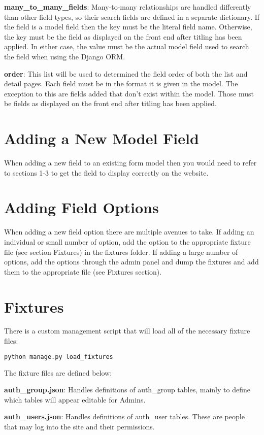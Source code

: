 \documentclass{article}
\begin{document}
\textbf{many\_to\_many\_fields}: Many-to-many relationships are handled differently than other field types, so their search fields are defined in a separate dictionary. If the field is a model field then the key must be the literal field name. Otherwise, the key must be the field as displayed on the front end after titling has been applied. In either case, the value must be the actual model field used to search the field when using the Django ORM.

\textbf{order}: This list will be used to determined the field order of both the list and detail pages.  Each field must be in the format it is given in the model.  The exception to this are fields added that don't exist within the model. Those must be fields as displayed on the front end after titling has been applied.

\section{Adding a New Model Field}
When adding a new field to an existing form model then you would need to refer to sections 1-3 to get the field to display correctly on the website.

\section{Adding Field Options}
When adding a new field option there are multiple avenues to take.  If adding an individual or small number of option, add the option to the appropriate fixture file (see section Fixtures) in the fixtures folder. If adding a large number of options, add the options through the admin panel and dump the fixtures and add them to the appropriate file (see Fixtures section).

\section{Fixtures}
There is a custom management script that will load all of the necessary fixture files:
\begin{lstlisting}[language=bash]
  python manage.py load_fixtures
\end{lstlisting}
The fixture files are defined below:

\textbf{auth\_group.json}: Handles definitions of auth\_group tables, mainly to define which tables will appear editable for Admins.

\textbf{auth\_users.json}: Handles definitions of auth\_user tables. These are people that may log into the site and their permissions.
\end{document}
